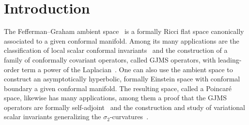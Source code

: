 \documentclass[pdftex]{sigma}
\numberwithin{equation}{section}
\begin{document}
\allowdisplaybreaks

\newcommand{\arXivNumber}{2202.11153}

\renewcommand{\PaperNumber}{086}

\FirstPageHeading










\section{Introduction}

The Fefferman--Graham ambient space~\cite{FeffermanGraham2012} is a formally Ricci flat space canonically associated to a given conformal manifold.
Among its many applications are the classification of local scalar conformal invariants~\cite{BaileyEastwoodGraham1994,Gover2001} and the construction of a family of conformally covariant operators, called GJMS operators, with leading-order term a power of the Laplacian~\cite{GJMS1992}.
One can also use the ambient space to construct an asymptotically hyperbolic, formally Einstein space with conformal boundary a given conformal manifold.
The resulting space, called a Poincar\'e space, likewise has many applications, among them a proof that the GJMS operators are formally self-adjoint~\cite{GrahamZworski2003} and the construction and study of variational scalar invariants generalizing the $\sigma_2$-curvatures~\cite{ChangFang2008,ChangFangGraham2012,Graham2009}.
\end{document}
